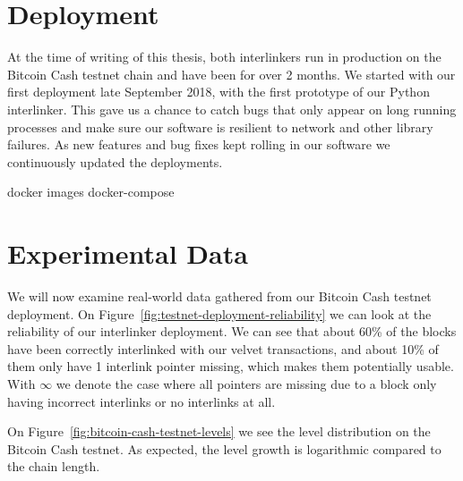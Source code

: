 \section{Deployment}
At the time of writing of this thesis, both interlinkers run in production on the Bitcoin Cash testnet chain and have been for over 2 months. We started with our first deployment late September 2018, with the first prototype of our Python interlinker. This gave us a chance to catch bugs that only appear on long running processes and make sure our software is resilient to network and other library failures. As new features and bug fixes kept rolling in our software we continuously updated the deployments.

docker images
docker-compose

\section{Experimental Data}

We will now examine real-world data gathered from our Bitcoin Cash testnet deployment. On Figure~\ref{fig:testnet-deployment-reliability} we can look at the reliability of our interlinker deployment. We can see that about 60\% of the blocks have been correctly interlinked with our velvet transactions, and about 10\% of them only have 1 interlink pointer missing, which makes them potentially usable. With $\infty$ we denote the case where all pointers are missing due to a block only having incorrect interlinks or no interlinks at all.


On Figure~\ref{fig:bitcoin-cash-testnet-levels} we see the level distribution on the Bitcoin Cash testnet. As expected, the level growth is logarithmic compared to the chain length.
